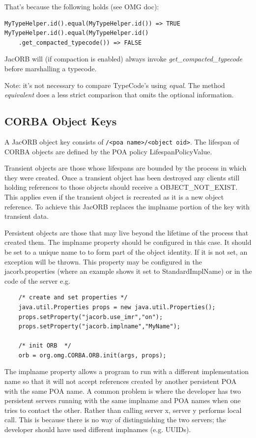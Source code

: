 That's because the following holds (see OMG doc):
\begin{verbatim}
MyTypeHelper.id().equal(MyTypeHelper.id()) => TRUE
MyTypeHelper.id().equal(MyTypeHelper.id()
    .get_compacted_typecode()) => FALSE
\end{verbatim}

JacORB will (if compaction is enabled) always invoke \emph{get\_compacted\_typecode} before marshalling a typecode.

Note: it's not necessary to compare TypeCode's using \emph{equal}. The method \emph{equivalent} does a less strict comparison
that omits the optional information.

\subsection{CORBA Object Keys}
\label{implname}
A JacORB object key consists of {\tt <impl name>/<poa name>/<object oid>}. The lifespan of CORBA objects are defined by the POA policy LifespanPolicyValue.

Transient objects are those whose lifespans are bounded by the process in which they were created. Once a transient object has been destroyed any clients still holding references to those objects should receive a OBJECT\_NOT\_EXIST. This applies even if the transient object is recreated as it is a new object reference. To achieve this JacORB replaces the implname portion of the key with transient data.

Persistent objects are those that may live beyond the lifetime of the process that created them. The implname property should be configured in this case. It should be set to a unique name to to form part of the object identity. If it is not set, an exception will be thrown. This property may be configured in the jacorb.properties (where an example shows it set to StandardImplName) or in the code of the server e.g.
\small{
\begin{verbatim}
    /* create and set properties */
    java.util.Properties props = new java.util.Properties();
    props.setProperty("jacorb.use_imr","on");
    props.setProperty("jacorb.implname","MyName");

    /* init ORB  */
    orb = org.omg.CORBA.ORB.init(args, props);
\end{verbatim}
}

The implname property allows a program to run with a different implementation name so that it will not accept references created by another persistent POA with the same POA name. A common problem is where the developer has two persistent servers running with the same implname and POA names when one tries to contact the other. Rather than calling server x, server y performs local call. This is because there is no way of distinguishing the two servers; the developer should have used different implnames (e.g. UUIDs).

